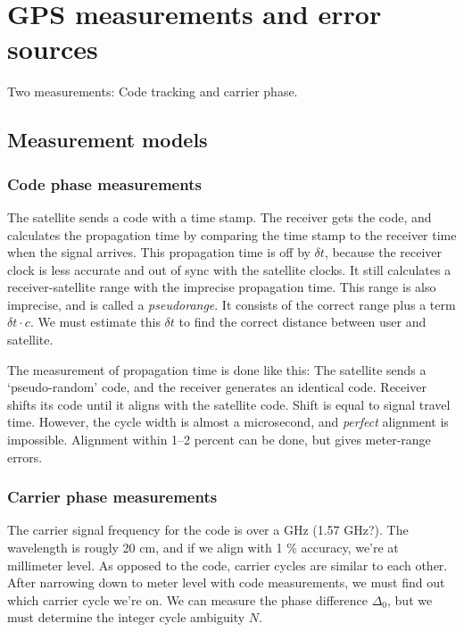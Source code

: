 \section{GPS measurements and error sources}
Two measurements: Code tracking and carrier phase.

\subsection{Measurement models}

\subsubsection{Code phase measurements}
The satellite sends a code with a time stamp. The receiver gets the code, and calculates the propagation time by comparing the time stamp to the receiver time when the signal arrives. This propagation time is off by $\delta t$, because the receiver clock is less accurate and out of sync with the satellite clocks. It still calculates a receiver-satellite range with the imprecise propagation time. This range is also imprecise, and is called a \emph{pseudorange}. It consists of the correct range plus a term $\delta t \cdot c$. We must estimate this $\delta t$ to find the correct distance between user and satellite.

The measurement of propagation time is done like this: The satellite sends a `pseudo-random' code, and the receiver generates an identical code. Receiver shifts its code until it aligns with the satellite code. Shift is equal to signal travel time. However, the cycle width is almost a microsecond, and \emph{perfect} alignment is impossible. Alignment within 1--2 percent can be done, but gives meter-range errors.

\subsubsection{Carrier phase measurements}
The carrier signal frequency for the code is over a GHz (1.57 GHz?). The wavelength is rougly 20 cm, and if we align with 1 \% accuracy, we're at millimeter level. As opposed to the code, carrier cycles are similar to each other. After narrowing down to meter level with code measurements, we must find out which carrier cycle we're on. We can measure the phase difference $\Delta_0$, but we must determine the integer cycle ambiguity $N$.

